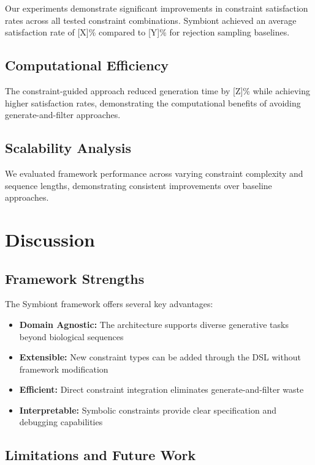 \documentclass[conference]{IEEEtran}
\begin{document}
Our experiments demonstrate significant improvements in constraint satisfaction rates across all tested constraint combinations. Symbiont achieved an average satisfaction rate of [X]\% compared to [Y]\% for rejection sampling baselines.

\subsection{Computational Efficiency}

The constraint-guided approach reduced generation time by [Z]\% while achieving higher satisfaction rates, demonstrating the computational benefits of avoiding generate-and-filter approaches.

\subsection{Scalability Analysis}

We evaluated framework performance across varying constraint complexity and sequence lengths, demonstrating consistent improvements over baseline approaches.

\section{Discussion}

\subsection{Framework Strengths}

The Symbiont framework offers several key advantages:

\begin{itemize}
    \item \textbf{Domain Agnostic:} The architecture supports diverse generative tasks beyond biological sequences
    \item \textbf{Extensible:} New constraint types can be added through the DSL without framework modification
    \item \textbf{Efficient:} Direct constraint integration eliminates generate-and-filter waste
    \item \textbf{Interpretable:} Symbolic constraints provide clear specification and debugging capabilities
\end{itemize}

\subsection{Limitations and Future Work}
\end{document}

